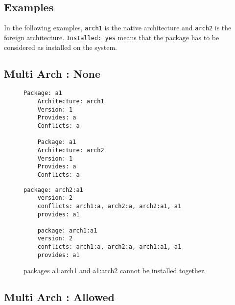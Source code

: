 \subsection{Examples}

In the following examples, \texttt{arch1} is the native architecture and
\texttt{arch2} is the foreign architecture. \texttt{Installed: yes} means that
the package has to be considered as installed on the system.

\subsection{Multi Arch : None}

\begin{figure}[h]
  \begin{minipage}[b]{0.45\linewidth}
    \begin{lstlisting}[style=debctrl]
    Package: a1
    Architecture: arch1
    Version: 1
    Provides: a
    Conflicts: a

    Package: a1
    Architecture: arch2
    Version: 1
    Provides: a
    Conflicts: a
    \end{lstlisting}
  \end{minipage}
  \begin{minipage}[b]{0.45\linewidth}
    \begin{lstlisting}[style=cudf]
    package: arch2:a1
    version: 2
    conflicts: arch1:a, arch2:a, arch2:a1, a1
    provides: a1

    package: arch1:a1
    version: 2
    conflicts: arch1:a, arch2:a, arch1:a1, a1
    provides: a1
    \end{lstlisting}
  \end{minipage}
\caption{packages a1:arch1 and a1:arch2 cannot be installed together.}
\label{fig:arch-none}
\end{figure}

\subsection{Multi Arch : Allowed}

